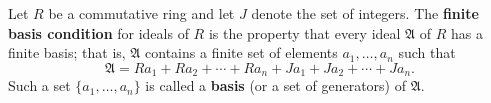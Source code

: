 Let $R$ be a commutative ring and let $J$ denote the set of integers. The \textbf{finite basis condition} for ideals of $R$ is the property that every ideal $\mathfrak{A}$ of $R$ has a finite basis; that is, $\mathfrak{A}$ contains a finite set of elements $a_1, \dots, a_n$ such that
$$
\mathfrak{A} = Ra_1 + Ra_2 + \cdots + Ra_n + Ja_1 + Ja_2 + \cdots + Ja_n.
$$
Such a set $\{a_1, \dots, a_n\}$ is called a \textbf{basis} (or a set of generators) of $\mathfrak{A}$.
